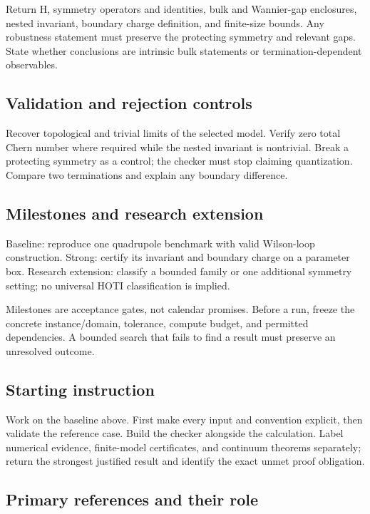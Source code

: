 \documentclass[
  11pt,
]{article}
\begin{document}
Return H, symmetry operators and identities, bulk and Wannier-gap
enclosures, nested invariant, boundary charge definition, and
finite-size bounds. Any robustness statement must preserve the
protecting symmetry and relevant gaps. State whether conclusions are
intrinsic bulk statements or termination-dependent observables.

\subsection{Validation and rejection controls}

Recover topological and trivial limits of the selected model. Verify
zero total Chern number where required while the nested invariant is
nontrivial. Break a protecting symmetry as a control; the checker must
stop claiming quantization. Compare two terminations and explain any
boundary difference.

\subsection{Milestones and research extension}

Baseline: reproduce one quadrupole benchmark with valid Wilson-loop
construction. Strong: certify its invariant and boundary charge on a
parameter box. Research extension: classify a bounded family or one
additional symmetry setting; no universal HOTI classification is
implied.

Milestones are acceptance gates, not calendar promises. Before a run,
freeze the concrete instance/domain, tolerance, compute budget, and
permitted dependencies. A bounded search that fails to find a result
must preserve an unresolved outcome.

\subsection{Starting instruction}

Work on the baseline above. First make every input and convention
explicit, then validate the reference case. Build the checker alongside
the calculation. Label numerical evidence, finite-model certificates,
and continuum theorems separately; return the strongest justified result
and identify the exact unmet proof obligation.

\subsection{Primary references and their role}
\end{document}
